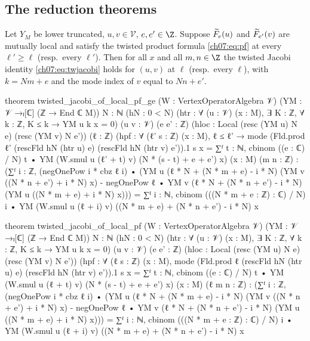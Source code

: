 \subsection{The reduction theorems}

\begin{theorem}\label{ch07:thm:reduction1}
Let $Y_M$ be lower truncated, $u,v\in\mathcal V$, $e,e'\in\Z$. Suppose $\widetilde{F}_e(u)$ and
$\widetilde{F}_{e'}(v)$ are mutually local and satisfy the twisted product formula \eqref{ch07:eq:pf}
at every $\ell'\ge\ell$ (resp.\ every $\ell'$). Then for all $x$ and all $m,n\in\Z$ the twisted
Jacobi identity \eqref{ch07:eq:twjacobi} holds for $(u,v)$ at $\ell$ (resp.\ every $\ell$), with
$k=Nm+e$ and the mode index of $v$ equal to $Nn+e'$.
\end{theorem}

\begin{leancode}
theorem twisted_jacobi_of_local_pf_ge (W : VertexOperatorAlgebra 𝒱)
    (YM : 𝒱 →ₗ[ℂ] (ℤ → End ℂ M))
    {N : ℕ} (hN : 0 < N) (htr : ∀ (u : 𝒱) (x : M), ∃ K : ℤ, ∀ k : ℤ, K ≤ k → YM u k x = 0)
    (u v : 𝒱) (e e' : ℤ)
    (hloc : Local (resc (YM u) N e) (resc (YM v) N e')) (ℓ : ℤ)
    (hpf : ∀ (ℓ' s : ℤ) (x : M), ℓ ≤ ℓ' →
      mode (Fld.prod ℓ' (rescFld hN (htr u) e) (rescFld hN (htr v) e')).1 s x
        = ∑ᶠ t : ℕ, cbinom ((e : ℂ) / N) t •
            YM (W.smul u (ℓ' + t) v) (N * (s - t) + e + e') x)
    (x : M) (m n : ℤ) :
    (∑ᶠ i : ℤ, (negOnePow i * cbz ℓ i) •
        (YM u (ℓ * N + (N * m + e) - i * N) (YM v ((N * n + e') + i * N) x)
          - negOnePow ℓ • YM v (ℓ * N + (N * n + e') - i * N) (YM u ((N * m + e) + i * N) x)))
      = ∑ᶠ i : ℕ, cbinom (((N * m + e : ℤ) : ℂ) / N) i •
          YM (W.smul u (ℓ + i) v) ((N * m + e) + (N * n + e') - i * N) x

theorem twisted_jacobi_of_local_pf (W : VertexOperatorAlgebra 𝒱) (YM : 𝒱 →ₗ[ℂ] (ℤ → End ℂ M))
    {N : ℕ} (hN : 0 < N) (htr : ∀ (u : 𝒱) (x : M), ∃ K : ℤ, ∀ k : ℤ, K ≤ k → YM u k x = 0)
    (u v : 𝒱) (e e' : ℤ)
    (hloc : Local (resc (YM u) N e) (resc (YM v) N e'))
    (hpf : ∀ (ℓ s : ℤ) (x : M),
      mode (Fld.prod ℓ (rescFld hN (htr u) e) (rescFld hN (htr v) e')).1 s x
        = ∑ᶠ t : ℕ, cbinom ((e : ℂ) / N) t •
            YM (W.smul u (ℓ + t) v) (N * (s - t) + e + e') x)
    (x : M) (ℓ m n : ℤ) :
    (∑ᶠ i : ℤ, (negOnePow i * cbz ℓ i) •
        (YM u (ℓ * N + (N * m + e) - i * N) (YM v ((N * n + e') + i * N) x)
          - negOnePow ℓ • YM v (ℓ * N + (N * n + e') - i * N) (YM u ((N * m + e) + i * N) x)))
      = ∑ᶠ i : ℕ, cbinom (((N * m + e : ℤ) : ℂ) / N) i •
          YM (W.smul u (ℓ + i) v) ((N * m + e) + (N * n + e') - i * N) x
\end{leancode}

